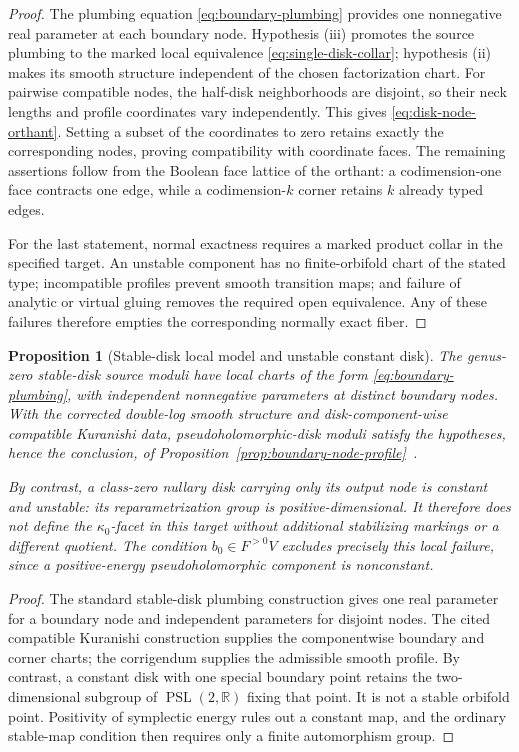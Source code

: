\documentclass[11pt,letterpaper,twoside]{article}
\theoremstyle{plain}
\newtheorem{proposition}[theorem]{Proposition}
\theoremstyle{definition}
\theoremstyle{remark}
\let\cite\citep
\begin{document}
\begin{proof}
The plumbing equation \eqref{eq:boundary-plumbing} provides one nonnegative real parameter at each boundary node.  Hypothesis \textup{(iii)} promotes the source plumbing to the marked local equivalence \eqref{eq:single-disk-collar}; hypothesis \textup{(ii)} makes its smooth structure independent of the chosen factorization chart.  For pairwise compatible nodes, the half-disk neighborhoods are disjoint, so their neck lengths and profile coordinates vary independently.  This gives \eqref{eq:disk-node-orthant}.  Setting a subset of the coordinates to zero retains exactly the corresponding nodes, proving compatibility with coordinate faces.  The remaining assertions follow from the Boolean face lattice of the orthant: a codimension-one face contracts one edge, while a codimension-\(k\) corner retains \(k\) already typed edges.

For the last statement, normal exactness requires a marked product collar in the specified target.  An unstable component has no finite-orbifold chart of the stated type; incompatible profiles prevent smooth transition maps; and failure of analytic or virtual gluing removes the required open equivalence.  Any of these failures therefore empties the corresponding normally exact fiber.
\end{proof}

\begin{proposition}[Stable-disk local model and unstable constant disk]\label{prop:disk-profile}
The genus-zero stable-disk source moduli have local charts of the form \eqref{eq:boundary-plumbing}, with independent nonnegative parameters at distinct boundary nodes.  With the corrected double-log smooth structure and disk-component-wise compatible Kuranishi data, pseudoholomorphic-disk moduli satisfy the hypotheses, hence the conclusion, of Proposition~\ref{prop:boundary-node-profile}~\cite{fooo2020,fooo2024corrigendum}.

By contrast, a class-zero nullary disk carrying only its output node is constant and unstable: its reparametrization group is positive-dimensional.  It therefore does not define the \(\kappa_0\)-facet in this target without additional stabilizing markings or a different quotient.  The condition \(b_0\in F^{>0}V\) excludes precisely this local failure, since a positive-energy pseudoholomorphic component is nonconstant.
\end{proposition}

\begin{proof}
The standard stable-disk plumbing construction gives one real parameter for a boundary node and independent parameters for disjoint nodes.  The cited compatible Kuranishi construction supplies the componentwise boundary and corner charts; the corrigendum supplies the admissible smooth profile.  By contrast, a constant disk with one special boundary point retains the two-dimensional subgroup of \(\operatorname{PSL}(2,\mathbb R)\) fixing that point.  It is not a stable orbifold point.  Positivity of symplectic energy rules out a constant map, and the ordinary stable-map condition then requires only a finite automorphism group.
\end{proof}
\end{document}
